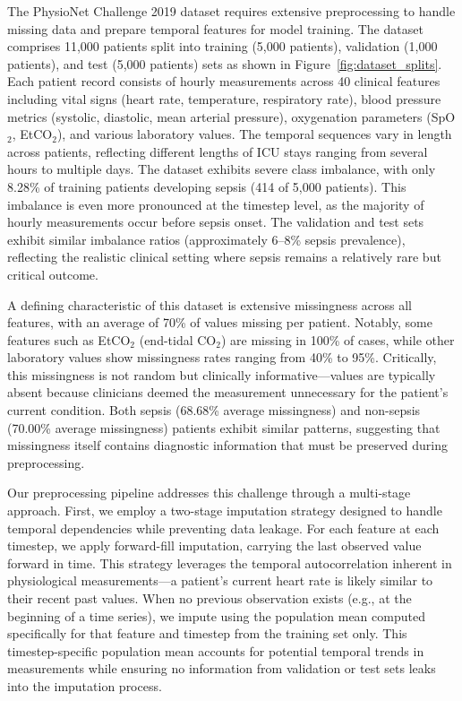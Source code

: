\documentclass{article}
\theoremstyle{plain}
\theoremstyle{definition}
\theoremstyle{remark}
\begin{document}
The PhysioNet Challenge 2019 dataset requires extensive preprocessing to handle missing data and prepare temporal features for model training. The dataset comprises 11,000 patients split into training (5,000 patients), validation (1,000 patients), and test (5,000 patients) sets as shown in Figure~\ref{fig:dataset_splits}. Each patient record consists of hourly measurements across 40 clinical features including vital signs (heart rate, temperature, respiratory rate), blood pressure metrics (systolic, diastolic, mean arterial pressure), oxygenation parameters (SpO$_2$, EtCO$_2$), and various laboratory values. The temporal sequences vary in length across patients, reflecting different lengths of ICU stays ranging from several hours to multiple days. The dataset exhibits severe class imbalance, with only 8.28\% of training patients developing sepsis (414 of 5,000 patients). This imbalance is even more pronounced at the timestep level, as the majority of hourly measurements occur before sepsis onset. The validation and test sets exhibit similar imbalance ratios (approximately 6--8\% sepsis prevalence), reflecting the realistic clinical setting where sepsis remains a relatively rare but critical outcome.

A defining characteristic of this dataset is extensive missingness across all features, with an average of 70\% of values missing per patient. Notably, some features such as EtCO$_2$ (end-tidal CO$_2$) are missing in 100\% of cases, while other laboratory values show missingness rates ranging from 40\% to 95\%. Critically, this missingness is not random but clinically informative---values are typically absent because clinicians deemed the measurement unnecessary for the patient's current condition. Both sepsis (68.68\% average missingness) and non-sepsis (70.00\% average missingness) patients exhibit similar patterns, suggesting that missingness itself contains diagnostic information that must be preserved during preprocessing.

Our preprocessing pipeline addresses this challenge through a multi-stage approach. First, we employ a two-stage imputation strategy designed to handle temporal dependencies while preventing data leakage. For each feature at each timestep, we apply forward-fill imputation, carrying the last observed value forward in time. This strategy leverages the temporal autocorrelation inherent in physiological measurements---a patient's current heart rate is likely similar to their recent past values. When no previous observation exists (e.g., at the beginning of a time series), we impute using the population mean computed specifically for that feature and timestep from the training set only. This timestep-specific population mean accounts for potential temporal trends in measurements while ensuring no information from validation or test sets leaks into the imputation process.
\end{document}
